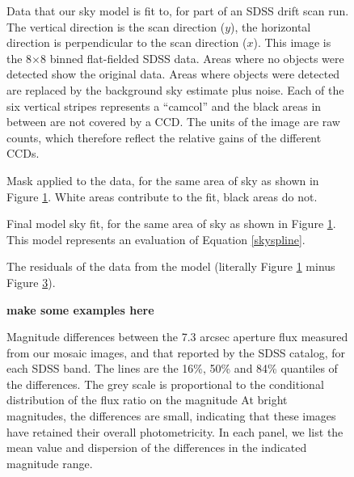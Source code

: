 \clearpage

\setcounter{thefigs}{0}

\clearpage
{}
\begin{figure}
\figurenum{\fignum}
\caption{\label{fig:rawrun} Data that our sky model is fit to, for
part of an SDSS drift scan run.  The vertical direction is the scan
direction ($y$), the horizontal direction is perpendicular to the scan
direction ($x$). This image is the 8$\times$8 binned flat-fielded SDSS
data. Areas where no objects were detected show the original data.
Areas where objects were detected are replaced by the background sky
estimate plus noise. Each of the six vertical stripes represents a
``camcol'' and the black areas in between are not covered by a
CCD. The units of the image are raw counts, which therefore reflect
the relative gains of the different CCDs. }
\end{figure}

\clearpage
{}
\begin{figure}
\figurenum{\fignum}
\caption{\label{fig:mask} Mask applied to the data, for the same area
of sky as shown in Figure \ref{fig:rawrun}. White areas contribute to
the fit, black areas do not.}
\end{figure}

\clearpage
{}
\begin{figure}
\figurenum{\fignum}
\caption{\label{fig:model} Final model sky fit, for the same area of
sky as shown in Figure \ref{fig:rawrun}. This model represents an
evaluation of Equation \ref{skyspline}.}
\end{figure}

\clearpage
{}
\begin{figure}
\figurenum{\fignum}
\caption{\label{fig:resid} The residuals of the data from the model
(literally Figure \ref{fig:rawrun} minus Figure \ref{fig:model}).}
\end{figure}

\clearpage
{}
\begin{figure}
\figurenum{\fignum}
\caption{\label{fig:examples} {\bf make some examples here}}
\end{figure}

\clearpage
{}
\begin{figure}
\figurenum{\fignum}
\caption{\label{fig:sdss_qa_magdiff} Magnitude differences between
the 7.3 arcsec aperture flux measured from our mosaic images, and that
reported by the SDSS catalog, for each SDSS band. The lines are the
16\%, 50\% and 84\% quantiles of the differences. The grey scale is
proportional to the conditional distribution of the flux ratio on the
magnitude At bright magnitudes, the differences are small, indicating
that these images have retained their overall photometricity. In each
panel, we list the mean value and dispersion of the differences in the
indicated magnitude range. }
\end{figure}

